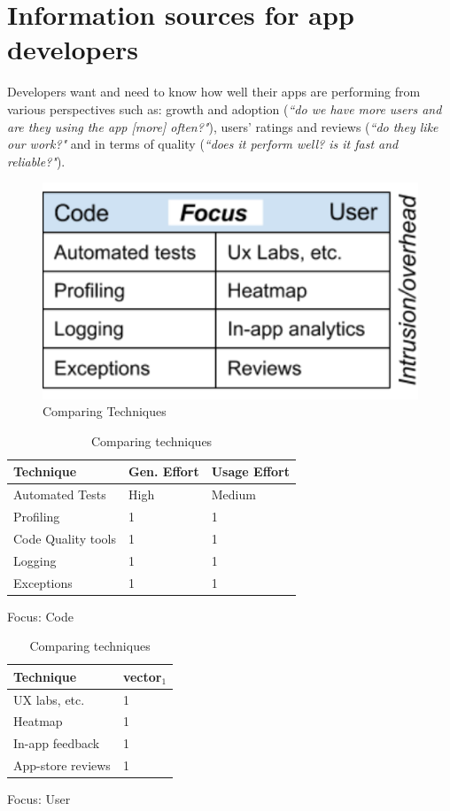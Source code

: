 \section{Information sources for app developers}
Developers want and need to know how well their apps are performing from various perspectives such as: growth and adoption (\emph{``do we have more users and are they using the app [more] often?"}), users' ratings and reviews (\emph{``do they like our work?"} and in terms of quality (\emph{``does it perform well? is it fast and reliable?"}). 

\begin{figure}
    \includegraphics[width=\linewidth]{images/ComparingTechniquesRHS.pdf}
    \caption{Comparing Techniques}
    \label{fig:comparing_techniques}
\end{figure}

\begin{table}
\RawFloats
    \parbox{.40\linewidth}{
        \centering
        \small
        \begin{tabular}{lll}
            Technique  & Gen. Effort & Usage Effort  \\
            \hline
            Automated Tests  & High  & Medium \\ 
            Profiling   & 1 & 1 \\
            Code Quality tools & 1 & 1 \\
            Logging   & 1 & 1 \\ 
            Exceptions  & 1 & 1 \\ 

        \end{tabular}
        \caption{Focus: Code \label{HRVtable}}
    }
    \hfill
    \parbox{.40\linewidth}{
        \centering
        \small
        \begin{tabular}{ll}
            Technique & vector$_1$  \\
            \hline
            UX labs, etc. & 1  \\ 
            Heatmap & 1  \\ 
            In-app feedback & 1  \\ 
            App-store reviews & 1  \\
        \end{tabular}
        \caption{Focus: User \label{BACtable}}}
    \caption{Comparing techniques}
\end{table}

